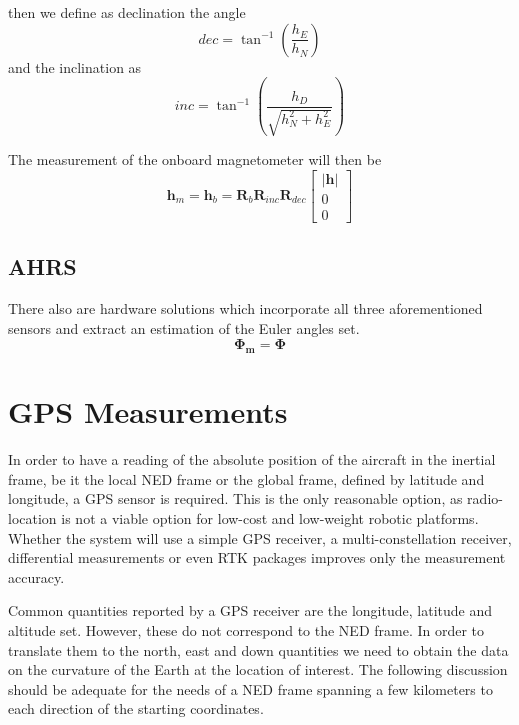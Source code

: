 then we define as declination the angle
\begin{equation}
	dec = \tan^{-1}\left(\frac{h_E}{h_N}\right)
\end{equation}
and the inclination as
\begin{equation}
	inc = \tan^{-1}\left(\frac{h_D}{\sqrt{h_N^2 + h_E^2}}\right)
\end{equation}

The measurement of the onboard magnetometer will then be
\begin{equation} \label{eq:magField}
	\bm{h}_m = \bm{h}_b =\bm{R}_b \bm{R}_{inc}\bm{R}_{dec} \begin{bmatrix}
			\lvert \bm{h} \rvert \\ 0 \\ 0
	\end{bmatrix}
\end{equation}

\subsection{AHRS}
There also are hardware solutions which incorporate all three aforementioned sensors and extract an estimation of the Euler angles set.
\begin{equation}
	\bm{\Phi_{m}} = \bm{\Phi}
\end{equation}

\section{GPS Measurements}
In order to have a reading of the absolute position of the aircraft in the inertial frame, be it the local NED frame or the global frame, defined by latitude and longitude, a GPS sensor is required. This is the only reasonable option, as radio-location is not a viable option for low-cost and low-weight robotic platforms. Whether the system will use a simple GPS receiver, a multi-constellation receiver, differential measurements or even RTK packages improves only the measurement accuracy.

Common quantities reported by a GPS receiver are the longitude, latitude and altitude set. However, these do not correspond to the NED frame. In order to translate them to the north, east and down quantities we need to obtain the data on the curvature of the Earth at the location of interest. The following discussion should be adequate for the needs of a NED frame spanning a few kilometers to each direction of the starting coordinates.

